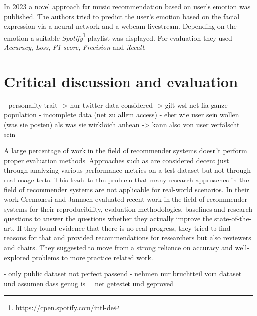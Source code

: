 \documentclass[runningheads,a4paper]{llncs}
\begin{document}
In 2023 a novel approach for music recommendation based on user's emotion was published. 
The authors tried to predict the user's emotion based on the facial expression via a neural network and a webcam livestream.
Depending on the emotion a suitable \textit{Spotify}\footnote{\url{https://open.spotify.com/intl-de}} playlist was displayed.
For evaluation they used \textit{Accuracy}, \textit{Loss}, \textit{F1-score}, \textit{Precision} and \textit{Recall}.
\cite{priyanka2023novel}

\section{Critical discussion and evaluation}

- personality trait -> nur twitter data considered -> gilt wsl net fia ganze population
- incomplete data (net zu allem access)
- eher wie user sein wollen (was sie posten) als was sie wirklöich anhean -> kann also von user verfälscht sein 


A large percentage of work in the field of recommender systems doesn't perform proper evaluation methods. 
Approaches such as \cite{niyazov2021content} are considered decent just through analyzing various performance metrics on a test dataset but not 
through real usage tests. This leads to the problem that many research approaches in the field of recommender systems are 
not applicable for real-world scenarios. 
In their work Cremonesi and Jannach evaluated recent work in the field of recommender systems for their reproducibility, 
evaluation methodologies, baselines and research questions to answer the questions whether they actually improve the state-of-the-art.
If they found evidence that there is no real progress, they tried to find reasons for that and provided recommendations for researchers 
but also reviewers and chairs. 
They suggested to move from a strong reliance on accuracy and well-explored problems to more practice related work. \cite{cremonesi2021progress} 


- only public dataset not perfect passend 
- nehmen nur bruchtteil vom dataset und assumen dass genug is = net getestet und geproved 
\end{document}
